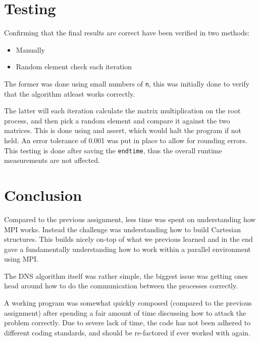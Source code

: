 \documentclass[a4paper,11pt,oneside]{book}
\begin{document}
\chapter{Testing}
Confirming that the final results are correct have been verified in two methods:

\begin{itemize}
\item Manually
\item Random element check each iteration
\end{itemize}

The former was done using small numbers of \verb!n!, this was initially done to verify that the algorithm atleast works correctly.

The latter will each iteration calculate the matrix multiplication on the root process, and then pick a random element and compare it against the two matrices. This is done using and assert, which would halt the program if not held. An error tolerance of 0.001 was put in place to allow for rounding errors.
This testing is done after saving the \verb!endtime!, thus the overall runtime measurements are not affected.

\chapter{Conclusion}
Compared to the previous assignment, less time was spent on understanding how MPI works. Instead the challenge was understanding how to build Cartesian structures. This builds nicely on-top of what we previous learned and in the end gave a fundamentally understanding how to work within a parallel environment using MPI.

The DNS algorithm itself was rather simple, the biggest issue was getting ones head around how to do the communication between the processes correctly.

A working program was somewhat quickly composed (compared to the previous assignment) after spending a fair amount of time discussing how to attack the problem correctly. Due to severe lack of time, the code has not been adhered to different coding standards, and should be re-factored if ever worked with again.


\end{document}
